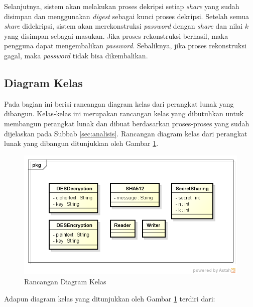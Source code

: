 Selanjutnya, sistem akan melakukan proses dekripsi setiap \textit{share} yang sudah disimpan dan menggunakan \textit{digest} sebagai kunci proses dekripsi. Setelah semua \textit{share} didekripsi, sistem akan merekonstruksi \textit{password} dengan \textit{share} dan nilai $k$ yang disimpan sebagai masukan. Jika proses rekonstruksi berhasil, maka pengguna dapat mengembalikan \textit{password}. Sebaliknya, jika proses rekonstruksi gagal, maka \textit{password} tidak bisa dikembalikan.

\subsection{Diagram Kelas}

Pada bagian ini berisi rancangan diagram kelas dari perangkat lunak yang dibangun. Kelas-kelas ini merupakan rancangan kelas yang dibutuhkan untuk membangun perangkat lunak dan dibuat berdasarkan proses-proses yang sudah dijelaskan pada Subbab \ref{sec:analisis}. Rancangan diagram kelas dari perangkat lunak yang dibangun ditunjukkan oleh Gambar \ref{fig:diagramkelasdummy}.

\begin{figure}[H]
	\centerline{\includegraphics[scale=0.6]{Gambar/engine-class-diagram}}
	\caption{Rancangan Diagram Kelas}\label{fig:diagramkelasdummy}
\end{figure}

Adapun diagram kelas yang ditunjukkan oleh Gambar \ref{fig:diagramkelasdummy} terdiri dari:

